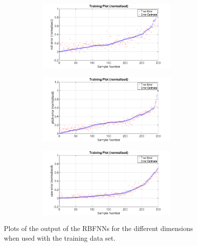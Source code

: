 \begin{figure}
\begin{subfigure}{0.48\textwidth}
\begin{subfigure}{\textwidth}
    \end{subfigure}
    \caption{}
  \end{subfigure}
  \begin{subfigure}{0.48\textwidth}
    \begin{subfigure}{\textwidth}
      \includegraphics[clip, trim = 80 0 100 0, width=\textwidth]{figures/chapter4/tr_roll}
    \end{subfigure}
    \begin{subfigure}{\textwidth}
      \includegraphics[clip, trim = 80 0 100 0, width=\textwidth]{figures/chapter4/tr_pitch}
    \end{subfigure}
    \begin{subfigure}{\textwidth}
      \includegraphics[clip, trim = 80 0 100 0, width=\textwidth]{figures/chapter4/tr_yaw}
    \end{subfigure}
    \caption{}
  \end{subfigure}
  \caption[Output of the RBFNNs when used with the training set input.]{Plots of the output of the RBFNNs for the different dimensions when used with the training data set.}
  \label{fig:chap4-rbf-train}
\end{figure}

